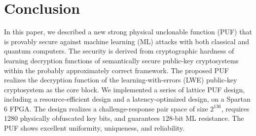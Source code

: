 \section{Conclusion}
\label{sec:conclusion}
In this paper, we described a new strong physical unclonable function (PUF) that is provably secure against machine learning (ML) attacks with both classical and quantum computers. 
The security is derived from cryptographic hardness of learning decryption functions of semantically secure public-key cryptosystems within the probably approximately correct  framework.
The proposed PUF realizes the decryption function of the learning-with-errors (LWE) public-key cryptosystem as the core block. 
We implemented a series of lattice PUF design, including a resource-efficient design and a latency-optimized design, on a Spartan 6 FPGA. The design realizes a challenge-response pair space of size $2^{136}$, requires $1280$ physically obfuscated key bits, and guarantees $128$-bit ML resistance. 
The PUF shows excellent uniformity, uniqueness, and reliability. 